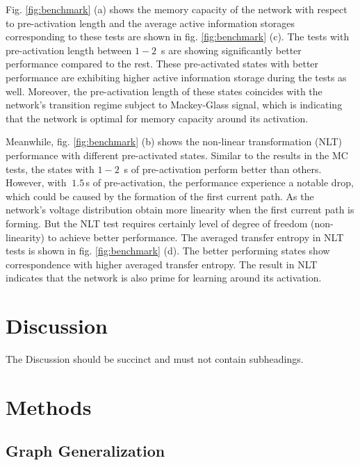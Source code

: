 \documentclass[fleqn,10pt,  reprint, amsmath,amssymb,aps, floatfix]{wlscirep}
\begin{document}
Fig. \ref{fig:benchmark} (a) shows the memory capacity of the network with respect to pre-activation length and the average active information storages corresponding to these tests are shown in fig. \ref{fig:benchmark} (c). The tests with pre-activation length between $1-2 \,$ s are showing significantly better performance compared to the rest. These pre-activated states with better performance are exhibiting higher active information storage during the tests as well. Moreover, the pre-activation length of these states coincides with the network's transition regime subject to Mackey-Glass signal, which is indicating that the network is optimal for memory capacity around its activation.

Meanwhile, fig. \ref{fig:benchmark} (b) shows the non-linear transformation (NLT) performance with different pre-activated states. Similar to the results in the MC tests, the states with $1-2 \,$ s of pre-activation perform better than others. However, with $~1.5 \,$s of pre-activation, the performance experience a notable drop, which could be caused by the formation of the first current path. As the network's voltage distribution obtain more linearity when the first current path is forming. But the NLT test requires certainly level of degree of freedom (non-linearity) to achieve better performance. The averaged transfer entropy in NLT tests is shown in fig. \ref{fig:benchmark} (d). The better performing states show correspondence with higher averaged transfer entropy. The result in NLT indicates that the network is also prime for learning around its activation.



\clearpage






\section*{Discussion}

The Discussion should be succinct and must not contain subheadings.

\section*{Methods}

\subsection*{Graph Generalization}
\end{document}
